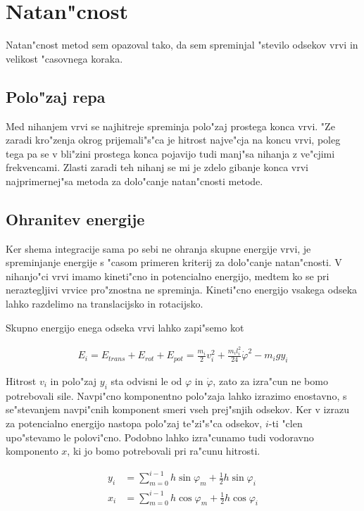 \documentclass[a4paper,10pt]{article}
\renewcommand{\phi}{\varphi}
\begin{document}
\section{Natan"cnost}

Natan"cnost metod sem opazoval tako, da sem spreminjal "stevilo odsekov vrvi in velikost "casovnega koraka. 

\subsection{Polo"zaj repa}

Med nihanjem vrvi se najhitreje spreminja polo"zaj prostega konca vrvi. "Ze zaradi kro"zenja okrog prijemali"s"ca je hitrost najve"cja na koncu vrvi, poleg tega pa se v bli"zini prostega konca pojavijo tudi manj"sa nihanja z ve"cjimi frekvencami. Zlasti zaradi teh nihanj se mi je zdelo gibanje konca vrvi najprimernej"sa metoda za dolo"canje natan"cnosti metode. 

\subsection{Ohranitev energije}

Ker shema integracije sama po sebi ne ohranja skupne energije vrvi, je spreminjanje energije s "casom primeren kriterij za dolo"canje natan"cnosti. V nihanjo"ci vrvi imamo kineti"cno in potencialno energijo, medtem ko se pri neraztegljivi vrvice pro"znostna ne spreminja. Kineti"cno energijo vsakega odseka lahko razdelimo na translacijsko in rotacijsko. 

Skupno energijo enega odseka vrvi lahko zapi"semo kot

\begin{align}
 E_i = E_{trans} + E_{rot} + E_{pot} = \frac{m_i}{2} v_i^2 + \frac{m_i l_i^2}{24} \dot{\phi}^2- m_i g y_i
\end{align}

Hitrost $v_i$ in polo"zaj $y_i$ sta odvisni le od $\phi$ in $\dot\phi$, zato za izra"cun ne bomo potrebovali sile. Navpi"cno komponentno polo"zaja lahko izrazimo enostavno, s se"stevanjem navpi"cnih komponent smeri vseh prej"snjih odsekov. Ker v izrazu za potencialno energijo nastopa polo"zaj te"zi"s"ca odsekov, $i$-ti "clen upo"stevamo le polovi"cno. Podobno lahko izra"cunamo tudi vodoravno komponento $x$, ki jo bomo potrebovali pri ra"cunu hitrosti. 

\begin{align}
 y_i &= \sum_{m=0}^{i-1} h \sin \phi_m + \frac{1}{2}h\sin\phi_i \\
 x_i &= \sum_{m=0}^{i-1} h \cos \phi_m + \frac{1}{2}h\cos\phi_i
\end{align}
\end{document}
